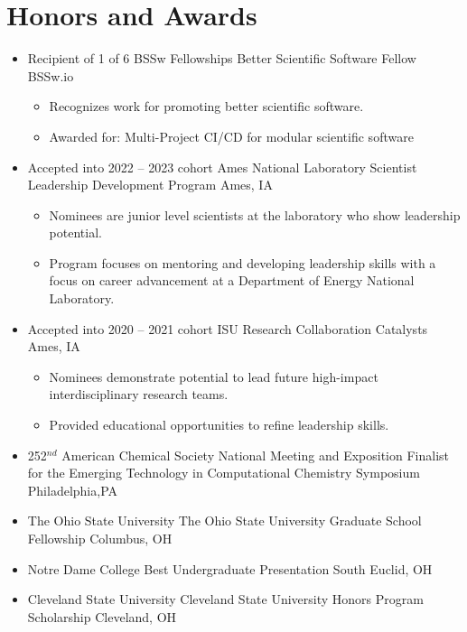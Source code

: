 \documentclass[11pt,a4paper,sans]{moderncv}
\begin{document}
\section{Honors and Awards}
\vspace{5pt}
\begin{itemize}
	\item{
		{Recipient of 1 of 6 BSSw Fellowships}
		{Better Scientific Software Fellow}
		{BSSw.io}
		{}
		{\begin{itemize}
			\item{Recognizes work for promoting better scientific software.}
			\item{Awarded for: Multi-Project CI/CD for modular scientific
				 software}
		\end{itemize}}}
	\item{
          	 {Accepted into 2022 -- 2023 cohort}
          	{Ames National Laboratory Scientist Leadership Development Program}
          	{Ames, IA}
          	{}
          	{\begin{itemize}
                  \item{Nominees are junior level scientists at the laboratory who show leadership potential.}
                  \item{Program focuses on mentoring and developing leadership skills with a focus on career advancement at a Department of Energy National Laboratory.}
           	 \end{itemize}}}
   	 \item{
  		 {Accepted into 2020 -- 2021 cohort}
 		 {ISU Research Collaboration Catalysts}
		 {Ames, IA}
		 {}
		 {\begin{itemize}
   		      \item{Nominees demonstrate potential to lead future high-impact interdisciplinary research teams.}
   		      \item{Provided educational opportunities to refine leadership skills.}
   	 	  \end{itemize}}}
	\item{
		  {252$^{nd}$ American Chemical Society National Meeting and Exposition}
	  	 {Finalist for the Emerging Technology in Computational Chemistry Symposium}
	  	 {Philadelphia,PA}
	  	 {}
	  	 {}}
	\item{
		  {The Ohio State University}
		  {The Ohio State University Graduate School Fellowship}
		  {Columbus, OH}
		  {}
		  {}}
	\item{
		  {Notre Dame College}
		  {Best Undergraduate Presentation}
		  {South Euclid, OH}
		  {}
		  {}}
	\item{
          {Cleveland State University}
          {Cleveland State University Honors Program Scholarship}
          {Cleveland, OH}
          {}
          {}}
\end{itemize}
\end{document}

